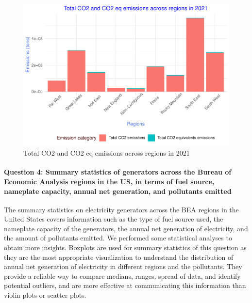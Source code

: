 \documentclass[
]{article}
\begin{document}
\begin{figure}

{\centering \includegraphics{EDA_Project_Mutha_Kry_Ghosh_VS_files/figure-latex/Q3plot-1} 

}

\caption{Total CO2 and CO2 eq emissions across regions in 2021}\label{fig:Q3plot}
\end{figure}

\hypertarget{question-4-summary-statistics-of-generators-across-the-bureau-of-economic-analysis-regions-in-the-us-in-terms-of-fuel-source-nameplate-capacity-annual-net-generation-and-pollutants-emitted}{%
\paragraph{Question 4: Summary statistics of generators across the
Bureau of Economic Analysis regions in the US, in terms of fuel source,
nameplate capacity, annual net generation, and pollutants
emitted}\label{question-4-summary-statistics-of-generators-across-the-bureau-of-economic-analysis-regions-in-the-us-in-terms-of-fuel-source-nameplate-capacity-annual-net-generation-and-pollutants-emitted}}

The summary statistics on electricity generators across the BEA regions
in the United States covers information such as the type of fuel source
used, the nameplate capacity of the generators, the annual net
generation of electricity, and the amount of pollutants emitted. We
performed some statistical analyses to obtain more insights. Boxplots
are used for summary statistics of this question as they are the most
appropriate visualization to understand the distribution of annual net
generation of electricity in different regions and the pollutants. They
provide a reliable way to compare medians, ranges, spread of data, and
identify potential outliers, and are more effective at communicating
this information than violin plots or scatter plots.
\end{document}
